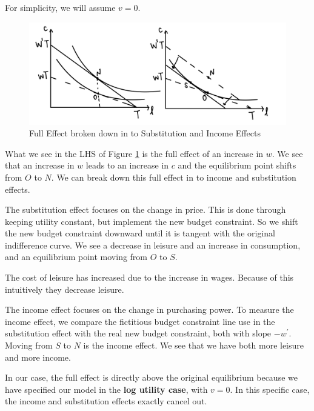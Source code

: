 \documentclass[11pt]{article}
\begin{document}
For simplicity, we will assume $v=0$.

\newpage

\begin{figure}[h]
    \centering
    \includegraphics[width=12cm]{photos/inc sub effect.jpeg}
    \caption{Full Effect broken down in to Substitution and Income Effects}
    \label{fig:sub inc effect}
\end{figure}

What we see in the LHS of Figure \ref{fig:sub inc effect} is the full effect of an increase in $w$. We see that an increase in $w$ leads to an increase in $c$ and the equilibrium point shifts from $O$ to $N$. 
We can break down this full effect in to income and substitution effects.

\begin{mdframed}
    The substitution effect focuses on the change in price. This is done through keeping utility constant, but implement the new budget constraint. So we shift the new budget constraint downward until it is tangent with the original indifference curve. We see a decrease in leisure and an increase in consumption, and an equilibrium point moving from $O$ to $S$.
    \begin{intu}
        The cost of leisure has increased due to the increase in wages. Because of this intuitively they decrease leisure.
    \end{intu}

    The income effect focuses on the change in purchasing power. To measure the income effect, we compare the fictitious budget constraint line use in the substitution effect with the real new budget constraint, both with slope $-w^\prime$. Moving from $S$ to $N$ is the income effect. We see that we have both more leisure and more income.
\end{mdframed}

\begin{note}
    In our case, the full effect is directly above the original equilibrium because we have specified our model in the \textbf{log utility case}, with $v=0$. In this specific case, the income and substitution effects exactly cancel out.
\end{note}
\end{document}
